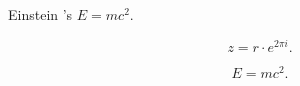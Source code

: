 \documentclass{article}
\begin{document}
Einstein 's $E=mc^2$.

\[ z = r\cdot e^{2\pi i}. \]

\begin{equation}
E=mc^2.
\end{equation}
\end{document}
